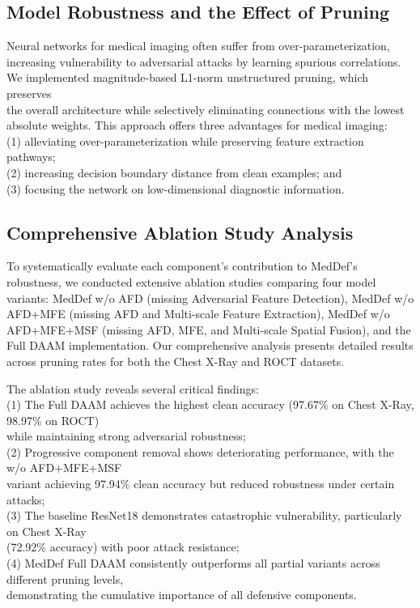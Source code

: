 \documentclass[preprint,12pt]{elsarticle}
\begin{document}
\subsection{Model Robustness and the Effect of Pruning}
Neural networks for medical imaging often suffer from over-parameterization, \\
increasing vulnerability to adversarial attacks by learning spurious correlations. \\
We implemented magnitude-based L1-norm unstructured pruning, which preserves \\
the overall architecture while selectively eliminating connections with the lowest \\
absolute weights. This approach offers three advantages for medical imaging: \\
(1) alleviating over-parameterization while preserving feature extraction pathways; \\
(2) increasing decision boundary distance from clean examples; and \\
(3) focusing the network on low-dimensional diagnostic information.

\subsection{Comprehensive Ablation Study Analysis}
To systematically evaluate each component's contribution to MedDef's robustness, we conducted extensive ablation studies comparing four model variants: MedDef w/o AFD (missing Adversarial Feature Detection), MedDef w/o AFD+MFE (missing AFD and Multi-scale Feature Extraction), MedDef w/o AFD+MFE+MSF (missing AFD, MFE, and Multi-scale Spatial Fusion), and the Full DAAM implementation. Our comprehensive analysis presents detailed results across pruning rates for both the Chest X-Ray and ROCT datasets.

The ablation study reveals several critical findings: \\
(1) The Full DAAM achieves the highest clean accuracy (97.67\% on Chest X-Ray, 98.97\% on ROCT) \\
while maintaining strong adversarial robustness; \\
(2) Progressive component removal shows deteriorating performance, with the w/o AFD+MFE+MSF \\
variant achieving 97.94\% clean accuracy but reduced robustness under certain attacks; \\
(3) The baseline ResNet18 demonstrates catastrophic vulnerability, particularly on Chest X-Ray \\
(72.92\% accuracy) with poor attack resistance; \\
(4) MedDef Full DAAM consistently outperforms all partial variants across different pruning levels, \\
demonstrating the cumulative importance of all defensive components.
\end{document}
